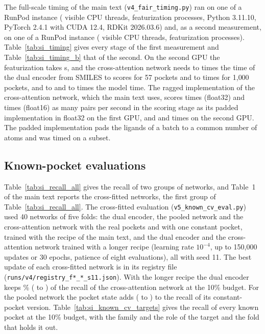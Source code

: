 \documentclass[journal=jcisd8,manuscript=article]{achemso}
\begin{document}
The full-scale timing of the main text (\texttt{v4\_fair\_timing.py}) ran on one \tmAGpu{} of a RunPod instance (\tmACpus{} visible CPU threads, \tmAProcs{} featurization processes, Python 3.11.10, PyTorch 2.4.1 with CUDA 12.4, RDKit 2026.03.6) and, as a second measurement, on one \tmBGpu{} of a RunPod instance (\tmBCpus{} visible CPU threads, \tmBProcs{} featurization processes). Table~\ref{tab:si_timing} gives every stage of the first measurement and Table~\ref{tab:si_timing_b} that of the second. On the second GPU the featurization takes \tmBFeat{} s, and the cross-attention network needs \tmBRatioXaHalfFiftySevenFull{} to \tmBRatioXaSingleFiftySevenFull{} times the time of the dual encoder from SMILES to scores for 57 pockets and \tmBRatioXaHalfThousandFull{} to \tmBRatioXaSingleThousandFull{} times for 1{,}000 pockets, and \tmBRatioXaHalfFiftySevenModel{} to \tmBRatioXaSingleFiftySevenModel{} and \tmBRatioXaHalfThousandModel{} to \tmBRatioXaSingleThousandModel{} times the model time. The ragged implementation of the cross-attention network, which the main text uses, scores \tmAPaddedSingle{} times (float32) and \tmAPaddedHalf{} times (float16) as many pairs per second in the scoring stage as its padded implementation in float32 on the first GPU, and \tmBPaddedSingle{} and \tmBPaddedHalf{} times on the second GPU. The padded implementation pads the ligands of a batch to a common number of atoms and was timed on a subset.

\subsection{Known-pocket evaluations}

Table~\ref{tab:si_recall_all} gives the recall of two groups of networks, and Table~1 of the main text reports the cross-fitted networks, the first group of Table~\ref{tab:si_recall_all}.
The cross-fitted evaluation (\texttt{v5\_known\_cv\_eval.py}) used 40 networks of five folds: the dual encoder, the pooled network and the cross-attention network with the real pockets and with one constant pocket, trained with the recipe of the main text, and the dual encoder and the cross-attention network trained with a longer recipe (learning rate $10^{-4}$, up to 150{,}000 updates or 30 epochs, patience of eight evaluations), all with seed 11. The best update of each cross-fitted network is in its registry file (\texttt{runs/v4/registry\_f*\_*\_s11.json}). With the longer recipe the dual encoder keeps \kfRatioDualLong{}\% (\kfRatioDualLongLo{} to \kfRatioDualLongHi{}) of the recall of the cross-attention network at the 10\% budget. For the pooled network the pocket state adds \kfDiffPooledPooledConstTen{} (\kfDiffPooledPooledConstTenLo{} to \kfDiffPooledPooledConstTenHi{}) to the recall of its constant-pocket version. Table~\ref{tab:si_known_cv_targets} gives the recall of every known pocket at the 10\% budget, with the family and the role of the target and the fold that holds it out.
\end{document}
